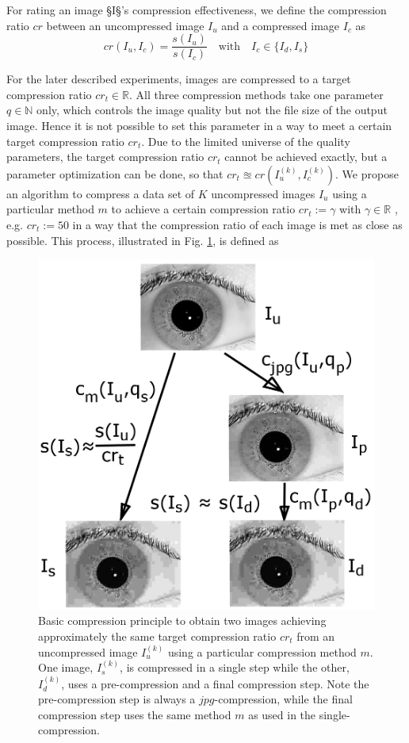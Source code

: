 \documentclass[10pt,twocolumn,letterpaper]{article}
\begin{document}
For rating an image §I§'s compression effectiveness, we define the compression ratio $cr$ between an uncompressed image $I_u$ and a compressed image $I_c$ as 
\begin{equation}
cr(I_u, I_c) = \frac{s(I_u)}{s(I_c)} \quad \text{with} \quad I_c \in \{I_d, I_s\}
\end{equation}

For the later described experiments, images are compressed to a target compression ratio $cr_t \in \mathbb{R}$. All three compression methods take one parameter $q \in \mathbb{N}$ only, which controls the image quality but not the file size of the output image. Hence it is not possible to set this parameter in a way to meet a certain target compression ratio $cr_t$. Due to the limited universe of the quality parameters, the target compression ratio $cr_t$ cannot be achieved exactly, but a parameter optimization can be done, so that $cr_t \approxeq cr(I_u^{(k)}, I_c^{(k)})$. We propose an algorithm to compress a data set of $K$ uncompressed images $I_u$ using a particular method $m$ to achieve a certain compression ratio $cr_t := \gamma$ with $\gamma \in \mathbb{R}$ , e.g. $cr_t := 50$ in a way that the compression ratio of each image is met as close as possible. This process, illustrated in Fig. \ref{fig:comprScheme}, is defined as

\begin{figure}[h]
	\begin{center}
		
	\includegraphics[width=0.7\linewidth]{img/comprScheme}
\end{center}
	\caption{Basic compression principle to obtain two images achieving approximately the same target compression ratio $cr_t$ from an uncompressed image $I_u^{(k)}$ using a particular compression method $m$. One image, $I_s^{(k)}$, is compressed in a single step while the other, $I_d^{(k)}$, uses a pre-compression and a final compression step. Note the pre-compression step is always a $jpg$-compression, while the final compression step uses the same method $m$ as used in the single-compression.}
	\label{fig:comprScheme}
	
\end{figure}
\end{document}
